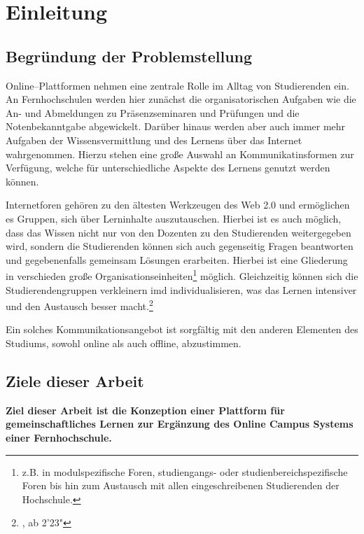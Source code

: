 \section{Einleitung} %
\label{sec:einleitung}

\subsection{Begründung der Problemstellung} %
\label{sub:begrundung_der_problemstellung}

Online--Plattformen nehmen eine zentrale Rolle im Alltag von Studierenden ein. An Fernhochschulen werden hier zunächst die organisatorischen Aufgaben wie die An- und Abmeldungen zu Präsenzseminaren und Prüfungen und die Notenbekanntgabe abgewickelt. Darüber hinaus werden aber auch immer mehr Aufgaben der Wissensvermittlung und des Lernens über das Internet wahrgenommen. Hierzu stehen eine große Auswahl an Kommunikatinsformen zur Verfügung, welche für unterschiedliche Aspekte des Lernens genutzt werden können.

Internetforen gehören zu den ältesten Werkzeugen des Web 2.0 und ermöglichen es Gruppen, sich über Lerninhalte auszutauschen. Hierbei ist es auch möglich, dass das Wissen nicht nur von den Dozenten zu den Studierenden weitergegeben wird, sondern die Studierenden können sich auch gegenseitig Fragen beantworten und gegebenenfalls gemeinsam Lösungen erarbeiten. Hierbei ist eine Gliederung in verschieden große Organisationseinheiten\footnote{z.B. in modulspezifische Foren, studiengangs- oder studienbereichspezifische Foren bis hin zum Austausch mit allen eingeschreibenen Studierenden der Hochschule.} möglich. Gleichzeitig können sich die  Studierendengruppen verkleinern imd individualisieren, was das Lernen intensiver und den Austausch besser macht.\footnote{\cite{roegner:trends}, ab 2'23"}

Ein solches Kommunikationsangebot ist sorgfältig mit den anderen Elementen des Studiums, sowohl online als auch offline, abzustimmen.

\subsection{Ziele dieser Arbeit} %
\label{sub:ziele_dieser_arbeit}
\textbf{Ziel dieser Arbeit ist die Konzeption einer Plattform für gemeinschaftliches Lernen zur Ergänzung des Online Campus Systems einer Fernhochschule.}

